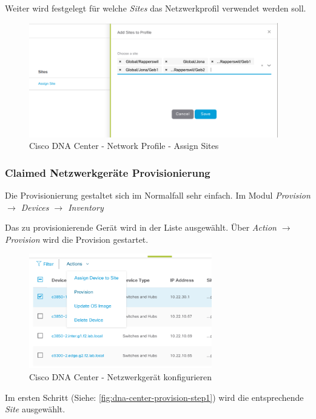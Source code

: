 Weiter wird festgelegt für welche \textit{Sites} das Netzwerkprofil verwendet werden soll. 

\begin{figure}[H]
	\centering
	\includegraphics[height=5cm]{img/secondtry/dna-center-network-profile-assign-sites.png}
	\caption{Cisco DNA Center - Network Profile - Assign Sites}
	\label{fig:dna-center-network-profile-assign-sites}
\end{figure}

\subsubsection{Claimed Netzwerkgeräte Provisionierung}

Die Provisionierung gestaltet sich im Normalfall sehr einfach. Im Modul \textit{Provision $\rightarrow$ Devices $\rightarrow$ Inventory}

Das zu provisionierende Gerät wird in der Liste ausgewählt. Über \textit{Action $\rightarrow$ Provision} wird die Provision gestartet. 

\begin{figure}[H]
	\centering
	\includegraphics[height=5cm]{img/secondtry/dna-center-provision-device.png}
	\caption{Cisco DNA Center - Netzwerkgerät konfigurieren}
	\label{fig:dna-center-provision-device}
\end{figure}

Im ersten Schritt (Siehe: \ref{fig:dna-center-provision-step1}) wird die entsprechende \textit{Site} ausgewählt. 

